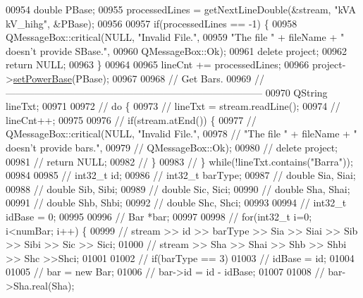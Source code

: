 \begin{DoxyCode}
00954   \textcolor{keywordtype}{double} PBase;
00955   processedLines = getNextLineDouble(&stream, \textcolor{stringliteral}{"kVA    kV\_hihg"}, &PBase);
00956 
00957   \textcolor{keywordflow}{if}(processedLines == -1) \{
00958     QMessageBox::critical(NULL, \textcolor{stringliteral}{"Invalid File."},
00959                           \textcolor{stringliteral}{"The file "} + fileName + \textcolor{stringliteral}{" doesn't provide SBase."},
00960                           QMessageBox::Ok);
00961     \textcolor{keyword}{delete} project;
00962     \textcolor{keywordflow}{return} NULL;
00963   \}
00964 
00965   lineCnt += processedLines;
00966   project->\hyperlink{class_project_abb4df805b3cd3af509a41e657eb4bb83}{setPowerBase}(PBase);
00967 
00968 \textcolor{comment}{// Get Bars.}
00969 \textcolor{comment}{//------------------------------------------------------------------------------}
00970   QString lineTxt;
00971 
00972 \textcolor{comment}{//  do \{}
00973 \textcolor{comment}{//    lineTxt = stream.readLine();}
00974 \textcolor{comment}{//    lineCnt++;}
00975 
00976 \textcolor{comment}{//    if(stream.atEnd()) \{}
00977 \textcolor{comment}{//      QMessageBox::critical(NULL, "Invalid File.",}
00978 \textcolor{comment}{//                            "The file " + fileName + " doesn't provide bars.",}
00979 \textcolor{comment}{//                            QMessageBox::Ok);}
00980 \textcolor{comment}{//      delete project;}
00981 \textcolor{comment}{//      return NULL;}
00982 \textcolor{comment}{//    \}}
00983 \textcolor{comment}{//  \} while(!lineTxt.contains("Barra"));}
00984 
00985 \textcolor{comment}{//  int32\_t id;}
00986 \textcolor{comment}{//  int32\_t barType;}
00987 \textcolor{comment}{//  double Sia, Siai;}
00988 \textcolor{comment}{//  double Sib, Sibi;}
00989 \textcolor{comment}{//  double Sic, Sici;}
00990 \textcolor{comment}{//  double Sha, Shai;}
00991 \textcolor{comment}{//  double Shb, Shbi;}
00992 \textcolor{comment}{//  double Shc, Shci;}
00993 
00994 \textcolor{comment}{//  int32\_t idBase = 0;}
00995 
00996 \textcolor{comment}{//  Bar *bar;}
00997 
00998 \textcolor{comment}{//  for(int32\_t i=0; i<numBar; i++) \{}
00999 \textcolor{comment}{//    stream >> id >> barType >> Sia >> Siai >> Sib >> Sibi >> Sic >> Sici;}
01000 \textcolor{comment}{//    stream >> Sha >> Shai >> Shb >> Shbi >> Shc >>Shci;}
01001 
01002 \textcolor{comment}{//    if(barType == 3)}
01003 \textcolor{comment}{//      idBase = id;}
01004 
01005 \textcolor{comment}{//    bar = new Bar;}
01006 \textcolor{comment}{//    bar->id = id - idBase;}
01007 
01008 \textcolor{comment}{//    bar->Sha.real(Sha);}

\end{DoxyCode}

